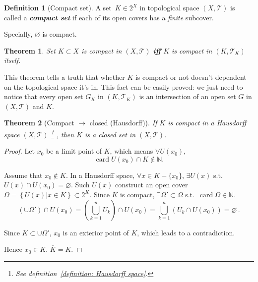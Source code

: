 \documentclass[openany]{book}
\newcommand*{\indexbf}[1]{\emph{\textbf{#1}}\index{#1}} %
\theoremstyle{plain}
\newtheorem{theorem}{Theorem}[section] %
\theoremstyle{definition}
\newtheorem{definition}{Definition}[section] %
\newcommand{\emphbf}[1]{\emph{\textbf{#1}}}
\DeclareMathOperator{\card}{card}
\begin{document}
\begin{definition}[Compact set]\label{definition: compact set}
	A set~$K \in 2^X$ in topological space $(X, \mathscr T)$ is called a \indexbf{compact set} if each of its open covers has a \emph{finite} subcover. 
\end{definition}

Specially, $\varnothing$ is compact.

\begin{theorem}\label{theorem: compact iff compact in subspace}
	Set $K \subset X$ is compact in $(X,\mathscr{T})$ \emphbf{iff} $K$ is compact in $(K, \mathscr{T}_K)$ itself. 
\end{theorem}

This theorem tells a truth that whether $K$ is compact or not doesn't dependent on the topological space it's in. 
This fact can be easily proved: we just need to notice that every open set $G_K$ in $(K, \mathscr T_K)$ is an intersection of an open set $G$ in $(X, \mathscr{T})$ and $K$. 

\begin{theorem}[Compact $\to$ closed (Hausdorff)]\label{theorem: compact sets are closed in Hausdorff space}
	If $K$ is compact in a Hausdorff space $(X, \mathscr{T})$%
		\footnote{See definition~\ref{definition: Hausdorff space}. }%
	, then $K$ is a closed set in $(X, \mathscr T)$.
\end{theorem}
\begin{proof}
	Let $x_0$ be a limit point of $K$, which means $\forall U(x_0)$, 
	\[
		\card U(x_0)\cap K \notin \mathbb{N}.
	\]

	Assume that $x_0 \notin K$. 
	In a Hausdorff space, $\forall x \in K - \{x_0\}$, $\exists U(x)$ s.t. $U(x)\cap U(x_0)=\varnothing$. 
	Such $U(x)$ construct an open cover $\varOmega=\left\{U(x)|x\in K \right\}\subset 2^K$. 
	Since $K$ is compact, $\exists \varOmega' \subset \varOmega$ s.t.\ $\card \Omega \in \mathbb{N}$. 
	\[
		\left(\cup\Omega'\right)
		\cap U(x_0)
		=
		\left(\bigcup_{k=1}^n{U_k}\right)
		\cap U(x_0)
		=
		\bigcup_{k=1}^n\left(
			U_k\cap U(x_0)
		\right)
		=
		\varnothing\,.
	\]

	Since $K\subset \cup \Omega'$, $x_0$ is an exterior point of $K$, which leads to a contradiction. 

	Hence $x_0 \in K$. $\overline K = K$.
\end{proof}
\end{document}
